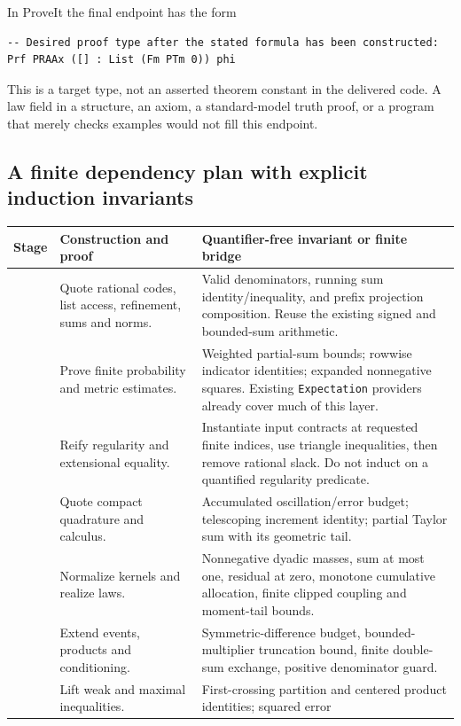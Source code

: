 In ProveIt the final endpoint has the form
\begin{lstlisting}
-- Desired proof type after the stated formula has been constructed:
Prf PRAAx ([] : List (Fm PTm 0)) phi
\end{lstlisting}
This is a target type, not an asserted theorem constant in the delivered
code. A law field in a structure, an axiom, a standard-model truth proof,
or a program that merely checks examples would not fill this endpoint.

\subsection{A finite dependency plan with explicit induction invariants}

\begin{longtable}{>{\raggedright\arraybackslash}p{}>{\raggedright\arraybackslash}p{}>{\raggedright\arraybackslash}p{}}
\toprule
Stage & Construction and proof & Quantifier-free invariant or finite bridge\\
\midrule\endhead
1 & Quote rational codes, list access, refinement, sums and norms. &
Valid denominators, running sum identity/inequality, and prefix projection
composition. Reuse the existing signed and bounded-sum arithmetic.\\
2 & Prove finite probability and metric estimates. &
Weighted partial-sum bounds; rowwise indicator identities; expanded
nonnegative squares. Existing \texttt{Expectation} providers already
cover much of this layer.\\
3 & Reify regularity and extensional equality. &
Instantiate input contracts at requested finite indices, use triangle
inequalities, then remove rational slack. Do not induct on a quantified
regularity predicate.\\
4 & Quote compact quadrature and calculus. &
Accumulated oscillation/error budget; telescoping increment identity;
partial Taylor sum with its geometric tail.\\
5 & Normalize kernels and realize laws. &
Nonnegative dyadic masses, sum at most one, residual at zero, monotone
cumulative allocation, finite clipped coupling and moment-tail bounds.\\
6 & Extend events, products and conditioning. &
Symmetric-difference budget, bounded-multiplier truncation bound, finite
double-sum exchange, positive denominator guard.\\
7 & Lift weak and maximal inequalities. &
First-crossing partition and centered product identities; squared error

\end{longtable}
